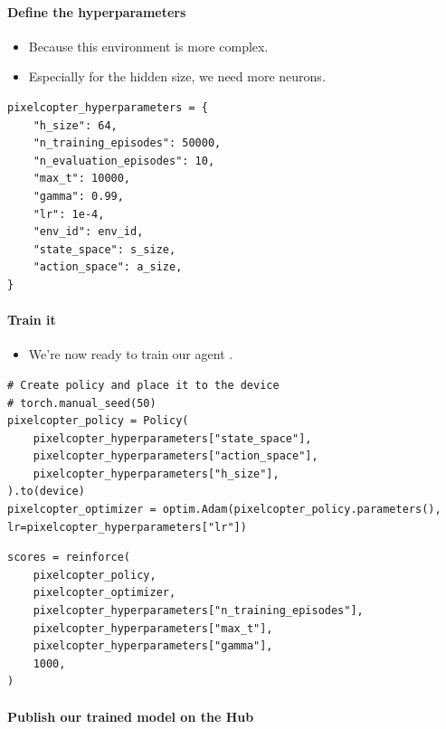 \documentclass[11pt,a4paper]{article}
\begin{document}
\paragraph{Define the hyperparameters}\label{define-the-hyperparameters}

\begin{itemize}
\tightlist
\item
  Because this environment is more complex.
\item
  Especially for the hidden size, we need more neurons.
\end{itemize}

\begin{lstlisting}
pixelcopter_hyperparameters = {
    "h_size": 64,
    "n_training_episodes": 50000,
    "n_evaluation_episodes": 10,
    "max_t": 10000,
    "gamma": 0.99,
    "lr": 1e-4,
    "env_id": env_id,
    "state_space": s_size,
    "action_space": a_size,
}
\end{lstlisting}

\paragraph{Train it}\label{train-it-1}

\begin{itemize}
\tightlist
\item
  We're now ready to train our agent .
\end{itemize}

\begin{lstlisting}
# Create policy and place it to the device
# torch.manual_seed(50)
pixelcopter_policy = Policy(
    pixelcopter_hyperparameters["state_space"],
    pixelcopter_hyperparameters["action_space"],
    pixelcopter_hyperparameters["h_size"],
).to(device)
pixelcopter_optimizer = optim.Adam(pixelcopter_policy.parameters(), lr=pixelcopter_hyperparameters["lr"])
\end{lstlisting}

\begin{lstlisting}
scores = reinforce(
    pixelcopter_policy,
    pixelcopter_optimizer,
    pixelcopter_hyperparameters["n_training_episodes"],
    pixelcopter_hyperparameters["max_t"],
    pixelcopter_hyperparameters["gamma"],
    1000,
)
\end{lstlisting}

\paragraph{Publish our trained model on the Hub}\label{publish-our-trained-model-on-the-hub-1}
\end{document}
